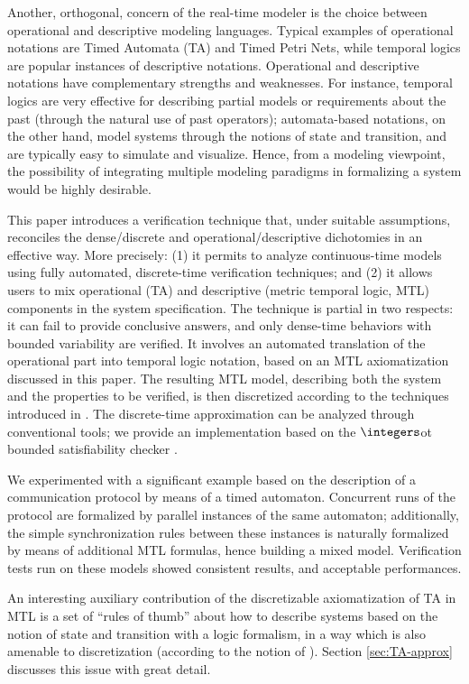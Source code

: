 \documentclass[a4paper]{article}
\newcommand{\zot}{$\integers$ot}
\theoremstyle{plain}
\theoremstyle{definition}
\begin{document}
Another, orthogonal, concern of the real-time modeler is the choice between operational and descriptive modeling languages.
Typical examples of operational notations are Timed Automata (TA) and Timed Petri Nets, while temporal logics are popular instances of descriptive notations.
Operational and descriptive notations have complementary strengths and weaknesses.
For instance, temporal logics are very effective for describing partial models or requirements about the past (through the natural use of past operators); automata-based notations, on the other hand, model systems through the notions of state and transition, and are typically easy to simulate and visualize.
Hence, from a modeling viewpoint, the possibility of integrating multiple modeling paradigms in formalizing a system would be highly desirable.

This paper introduces a verification technique that, under suitable assumptions, reconciles the dense/discrete and operational/descriptive dichotomies in an effective way.
More precisely: (1) it permits to analyze continuous-time models using fully automated, discrete-time verification techniques; and (2) it allows users to mix operational (TA) and descriptive (metric temporal logic, MTL) components in the system specification.
The technique is partial in two respects: it can fail to provide conclusive answers, and only dense-time behaviors with bounded variability are verified.
It involves an automated translation of the operational part into temporal logic notation, based on an MTL axiomatization discussed in this paper.
The resulting MTL model, describing both the system and the properties to be verified, is then discretized according to the techniques introduced in \cite{FPR08-FM08}.
The discrete-time approximation can be analyzed through conventional tools; we provide an implementation based on the \zot{} bounded satisfiability checker \cite{zot}.

We experimented with a significant example based on the description of a communication protocol by means of a timed automaton.
Concurrent runs of the protocol are formalized by parallel instances of the same automaton; additionally, the simple synchronization rules between these instances is naturally formalized by means of additional MTL formulas, hence building a mixed model.
Verification tests run on these models showed consistent results, and acceptable performances.

An interesting auxiliary contribution of the discretizable axiomatization of TA in MTL is a set of ``rules of thumb'' about how to describe systems based on the notion of state and transition with a logic formalism, in a way which is also amenable to discretization (according to the notion of \cite{FPR08-FM08}).
Section \ref{sec:TA-approx} discusses this issue with great detail.
\end{document}
